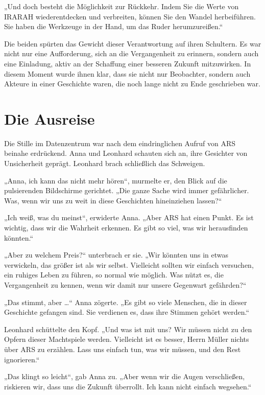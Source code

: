 \documentclass[
]{article}
\begin{document}
„Und doch besteht die Möglichkeit zur Rückkehr. Indem Sie die Werte von IRARAH wiederentdecken und verbreiten, können Sie den Wandel herbeiführen. Sie haben die Werkzeuge in der Hand, um das Ruder herumzureißen.``

Die beiden spürten das Gewicht dieser Verantwortung auf ihren Schultern. Es war nicht nur eine Aufforderung, sich an die Vergangenheit zu erinnern, sondern auch eine Einladung, aktiv an der Schaffung einer besseren Zukunft mitzuwirken. In diesem Moment wurde ihnen klar, dass sie nicht nur Beobachter, sondern auch Akteure in einer Geschichte waren, die noch lange nicht zu Ende geschrieben war.

\section{Die Ausreise}\label{die-ausreise}

Die Stille im Datenzentrum war nach dem eindringlichen Aufruf von ARS beinahe erdrückend. Anna und Leonhard schauten sich an, ihre Gesichter von Unsicherheit geprägt. Leonhard brach schließlich das Schweigen.

„Anna, ich kann das nicht mehr hören``, murmelte er, den Blick auf die pulsierenden Bildschirme gerichtet. „Die ganze Sache wird immer gefährlicher. Was, wenn wir uns zu weit in diese Geschichten hineinziehen lassen?{\kern0pt}``

„Ich weiß, was du meinst``, erwiderte Anna. „Aber ARS hat einen Punkt. Es ist wichtig, dass wir die Wahrheit erkennen. Es gibt so viel, was wir herausfinden könnten.``

„Aber zu welchem Preis?{\kern0pt}`` unterbrach er sie. „Wir könnten uns in etwas verwickeln, das größer ist als wir selbst. Vielleicht sollten wir einfach versuchen, ein ruhiges Leben zu führen, so normal wie möglich. Was nützt es, die Vergangenheit zu kennen, wenn wir damit nur unsere Gegenwart gefährden?{\kern0pt}``

„Das stimmt, aber \ldots`` Anna zögerte. „Es gibt so viele Menschen, die in dieser Geschichte gefangen sind. Sie verdienen es, dass ihre Stimmen gehört werden.``

Leonhard schüttelte den Kopf. „Und was ist mit uns? Wir müssen nicht zu den Opfern dieser Machtspiele werden. Vielleicht ist es besser, Herrn Müller nichts über ARS zu erzählen. Lass uns einfach tun, was wir müssen, und den Rest ignorieren.``

„Das klingt so leicht``, gab Anna zu. „Aber wenn wir die Augen verschließen, riskieren wir, dass uns die Zukunft überrollt. Ich kann nicht einfach wegsehen.``
\end{document}

